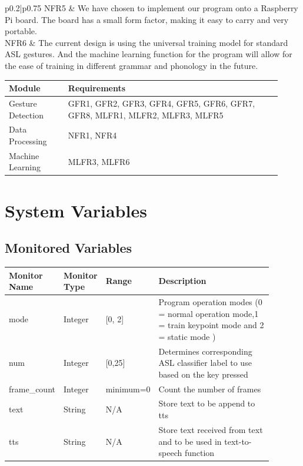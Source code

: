 \documentclass[12pt, titlepage]{article}
\begin{document}
\begin{longtable}{p{0.2\textwidth}|p{0.75\textwidth}}
\hline
NFR5
& We have chosen to implement our program onto a Raspberry Pi board. The board has a small form factor, making it easy to carry and very portable.\\
\hline
NFR6
& The current design is using the universal training model for standard ASL gestures. And the machine learning function for the program will allow for the ease of training in different grammar and phonology in the future.\\
\hline
\caption{Requirements and Design Decisions}
\end{longtable}

\renewcommand{\arraystretch}{1.2}
\noindent \begin{tabularx}{\textwidth}{p{0.2\linewidth}|p{0.72\linewidth}}
\toprule
\textbf{Module} & \textbf{Requirements}\\
\midrule
Gesture Detection
& GFR1, GFR2, GFR3, GFR4, GFR5, GFR6, GFR7, GFR8, MLFR1, MLFR2, MLFR3, MLFR5\\
\hline
Data Processing
& NFR1, NFR4\\
\hline
Machine Learning
& MLFR3, MLFR6\\
\bottomrule
\end{tabularx}

\section{System Variables}
\subsection{Monitored Variables}

\renewcommand{\arraystretch}{1.2}
\noindent \begin{tabularx}{\textwidth}{p{0.15\linewidth}|p{0.12\linewidth}|p{0.12\linewidth}|p{0.5\linewidth}}
\toprule
\textbf{Monitor Name} & \textbf{Monitor Type} & \textbf{Range} & \textbf{Description}\\
\midrule
mode & Integer & [0, 2] & Program operation modes (0 = normal operation mode,1 = train keypoint mode and 2 = static mode )\\
\hline
num & Integer & [0,25] & Determines corresponding ASL classifier label to use based on the key pressed\\
\hline
frame\_count & Integer & minimum=0 & Count the number of frames\\
\hline
text & String & N/A & Store text to be append to tts\\
\hline
tts & String & N/A & Store text received from text and to be used in text-to-speech function\\
\bottomrule
\end{tabularx}
\end{document}
